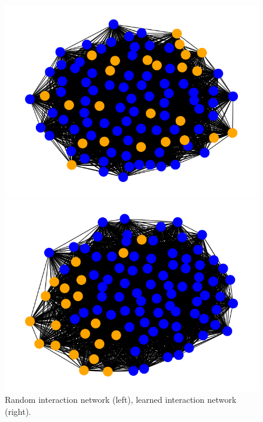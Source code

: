 \documentclass[9pt]{IEEEtran}
\begin{document}
\begin{figure}[hbt]
    \centering
    \begin{minipage}{0.20\textwidth}
        \centering
        \includegraphics[width=\textwidth]{randomNet.png}
    \end{minipage}
    \begin{minipage}{0.25\textwidth}
        \centering
        \includegraphics[width=\textwidth]{learnedNet.png}
    \end{minipage}
    \caption{Random interaction network (left), learned interaction network (right).}
    \label{fig:nets_unfiltered}
\end{figure}
\end{document}
